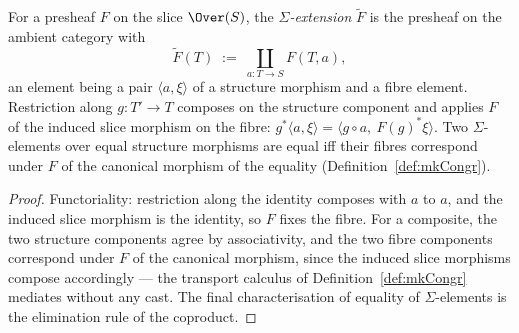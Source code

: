 \begin{definition}
  \label{def:sigmaExtension}
  \leanok
  For a presheaf \(F\) on the slice \(\Over(S)\), the \emph{\(\Sigma\)-extension}
  \(\widetilde F\) is the presheaf on the ambient category with
  \[
    \widetilde F(T) \;:=\; \coprod_{a \colon T \to S} F(T, a) ,
  \]
  an element being a pair \(\langle a, \xi\rangle\) of a structure morphism and a fibre
  element. Restriction along \(g \colon T' \to T\) composes on the structure component and
  applies \(F\) of the induced slice morphism on the fibre:
  \(g^{*}\langle a, \xi \rangle = \langle g \circ a,\ F(g)^{*}\xi\rangle\). Two
  \(\Sigma\)-elements over equal structure morphisms are equal iff their fibres correspond
  under \(F\) of the canonical morphism of the equality (Definition~\ref{def:mkCongr}).
\end{definition}
\begin{proof}
  \leanok
  Functoriality: restriction along the identity composes with \(a\) to \(a\), and the
  induced slice morphism is the identity, so \(F\) fixes the fibre. For a composite, the two
  structure components agree by associativity, and the two fibre components correspond under
  \(F\) of the canonical morphism, since the induced slice morphisms compose accordingly —
  the transport calculus of Definition~\ref{def:mkCongr} mediates without any cast. The
  final characterisation of equality of \(\Sigma\)-elements is the elimination rule of the
  coproduct.
\end{proof}

